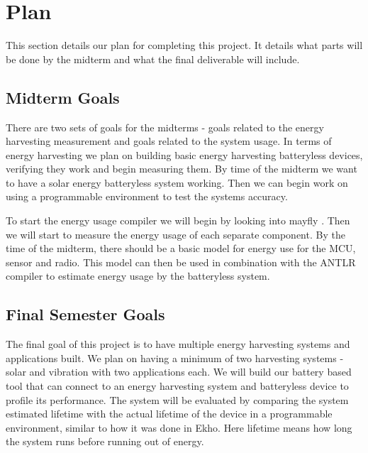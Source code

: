 \section{Plan} %
\label{sec:plan}

This section details our plan for completing this project. It details what parts will be done by the midterm and what the final deliverable will include.

\subsection{Midterm Goals}

There are two sets of goals for the midterms - goals related to the energy harvesting measurement and goals related to the system usage.
In terms of energy harvesting we plan on building basic energy harvesting batteryless devices, verifying they work and begin measuring them.
By time of the midterm we want to have a solar energy batteryless system working.
Then we can begin work on using a programmable environment to test the systems accuracy.

To start the energy usage compiler we will begin by looking into mayfly \cite{mayfly}.
Then we will start to measure the energy usage of each separate component.
By the time of the midterm, there should be a basic model for energy use for the MCU, sensor and radio.
This model can then be used in combination with the ANTLR compiler to estimate energy usage by the batteryless system.

\subsection{Final Semester Goals}
The final goal of this project is to have multiple energy harvesting systems and applications built.
We plan on having a minimum of two harvesting systems - solar and vibration with two applications each.
We will build our battery based tool that can connect to an energy harvesting system and batteryless device to profile its performance.
The system will be evaluated by comparing the system estimated lifetime with the actual lifetime of the device in a programmable environment, similar to how it was done in Ekho.
Here lifetime means how long the system runs before running out of energy.
